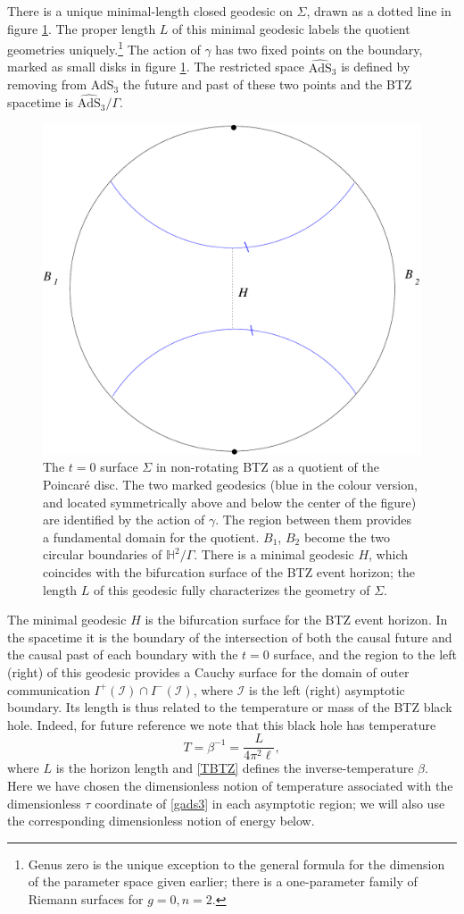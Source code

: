 \documentclass[12pt]{article}
\newcommand{\HH}{\mathbb{H}}
\newcommand{\be}{\begin{equation}}
\newcommand{\ee}{\end{equation}}
\numberwithin{equation}{section}
\begin{document}
There is a unique minimal-length closed geodesic on $\Sigma$, drawn as a dotted line in figure \ref{btz}. The proper length $L$ of this minimal geodesic labels the quotient geometries uniquely.\footnote{Genus zero is the unique exception to the general formula for the dimension of the parameter space given earlier; there is a one-parameter family of Riemann surfaces for $g=0, n=2$.}  The action of $\gamma$ has two fixed points on the boundary, marked as small disks in figure \ref{btz}. The restricted space $\widehat{\mathrm{AdS}}_3$ is defined by removing from AdS$_3$ the future and past of these two points and the BTZ spacetime is $\widehat{\mathrm{AdS}}_3 / \Gamma$.

\begin{figure}
\centering
\includegraphics[keepaspectratio,width=0.5\linewidth]{btz.pdf}
\caption{The $t=0$ surface $\Sigma$ in non-rotating BTZ as a quotient of the Poincar\'e disc. The two marked geodesics (blue in the colour version, and located symmetrically above and below the center of the figure) are identified by the action of $\gamma$. The region between them provides a fundamental domain for the quotient. $B_1$, $B_2$ become the two circular boundaries of $\HH^2/\Gamma$. There is a minimal geodesic $H$, which coincides with the bifurcation surface of the BTZ event horizon; the length $L$ of this geodesic fully characterizes the geometry of $\Sigma$.}
\label{btz}
\end{figure}


The minimal geodesic $H$ is the bifurcation surface for the BTZ event horizon. In the spacetime it is the boundary of the intersection of both the causal future and the causal past of each boundary with the $t=0$ surface, and the region to the left (right) of this geodesic provides a Cauchy surface for the domain of outer communication $I^+( \mathcal I) \cap I^- (\mathcal I)$, where $\mathcal I$ is the left (right) asymptotic boundary. Its length is thus related to the temperature or mass of  the BTZ black hole. Indeed, for future reference we note that this black hole has temperature
\be
\label{TBTZ}
T = \beta^{-1} = \frac{L}{4 \pi^2 \ell},
\ee
where $L$ is the horizon length and  \eqref{TBTZ} defines the inverse-temperature $\beta$.  Here we have chosen the dimensionless notion of temperature associated with the dimensionless $\tau$ coordinate of \eqref{gads3} in each asymptotic region; we will also use the corresponding dimensionless notion of energy below.
\end{document}
